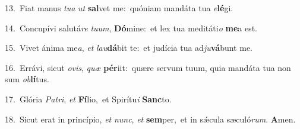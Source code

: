 {\numbfont\textcolor{\numbcolor}{13.}}~Fiat manus \textit{tu}\-\textit{a} \textit{ut} \textbf{sal}\-vet me:~\star quóniam mandáta tua \textit{e}\-\textbf{lé}gi.\par
{\numbfont\textcolor{\numbcolor}{14.}}~Concupívi salutá\textit{re} \textit{tu}\-\textit{um}, \textbf{Dó}\-mine:~\star et lex tua meditáti\textit{o} \textbf{me}\-a est.\par
{\numbfont\textcolor{\numbcolor}{15.}}~Vivet ánima me\-\textit{a}\-, \textit{et} \textit{lau}\-\textbf{dá}bit te:~\star et judícia tua ad\-\textit{ju}\-\textbf{vá}bunt me.\par
{\numbfont\textcolor{\numbcolor}{16.}}~Errávi, sicut \textit{o}\-\textit{vis}, \textit{quæ} \textbf{pér}\-iit:~\star quære servum tuum, quia mandáta tua non sum \textit{ob}\-\textbf{lí}tus.\par
{\numbfont\textcolor{\numbcolor}{17.}}~Glória \textit{Pa}\-\textit{tri}, \textit{et} \textbf{Fí}\-lio,~\star et Spirítu\textit{i} \textbf{Sanc}\-to.\par
{\numbfont\textcolor{\numbcolor}{18.}}~Sicut erat in princípio, \textit{et} \textit{nunc}\-, \textit{et} \textbf{sem}\-per,~\star et in sǽcula sæculó\-\textit{rum}\-. \textbf{A}\-men.\par
